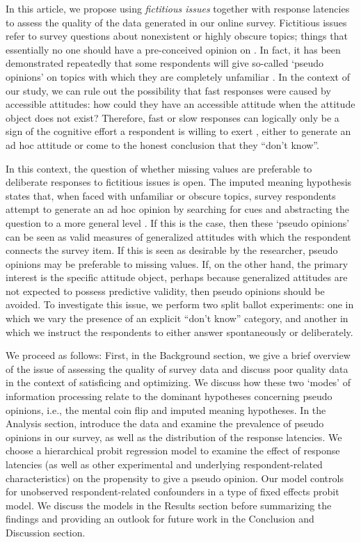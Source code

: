 \documentclass[Royal,times,sageh]{sagej}
\begin{document}
In this article, we propose using \textit{fictitious issues} together
with response latencies to assess the quality of the data generated in
our online survey. Fictitious issues refer to survey questions about
nonexistent or highly obscure topics; things that essentially no one
should have a pre-conceived opinion on \citep{Sturgis2010, Wolter2019}.
In fact, it has been demonstrated repeatedly that some respondents will
give so-called `pseudo opinions' on topics with which they are
completely unfamiliar
\citep{Sturgis2010, Payne1951, Bishop1980, Schuman1980}. In the context
of our study, we can rule out the possibility that fast responses were
caused by accessible attitudes: how could they have an accessible
attitude when the attitude object does not exist? Therefore, fast or
slow responses can logically only be a sign of the cognitive effort a
respondent is willing to exert \citep{Stocke2004c, Andersen2017}, either
to generate an ad hoc attitude or come to the honest conclusion that
they ``don't know''.

In this context, the question of whether missing values are preferable
to deliberate responses to fictitious issues is open. The imputed
meaning hypothesis states that, when faced with unfamiliar or obscure
topics, survey respondents attempt to generate an ad hoc opinion by
searching for cues and abstracting the question to a more general level
\citep{Sturgis2010}. If this is the case, then these `pseudo opinions'
can be seen as valid measures of generalized attitudes with which the
respondent connects the survey item. If this is seen as desirable by the
researcher, pseudo opinions may be preferable to missing values. If, on
the other hand, the primary interest is the specific attitude object,
perhaps because generalized attitudes are not expected to possess
predictive validity, then pseudo opinions should be avoided. To
investigate this issue, we perform two split ballot experiments: one in
which we vary the presence of an explicit ``don't know'' category, and
another in which we instruct the respondents to either answer
spontaneously or deliberately.

We proceed as follows: First, in the Background section, we give a brief
overview of the issue of assessing the quality of survey data and
discuss poor quality data in the context of satisficing and optimizing.
We discuss how these two `modes' of information processing relate to the
dominant hypotheses concerning pseudo opinions, i.e., the mental coin
flip and imputed meaning hypotheses. In the Analysis section, introduce
the data and examine the prevalence of pseudo opinions in our survey, as
well as the distribution of the response latencies. We choose a
hierarchical probit regression model to examine the effect of response
latencies (as well as other experimental and underlying
respondent-related characteristics) on the propensity to give a pseudo
opinion. Our model controls for unobserved respondent-related
confounders in a type of fixed effects probit model. We discuss the
models in the Results section before summarizing the findings and
providing an outlook for future work in the Conclusion and Discussion
section.
\end{document}
